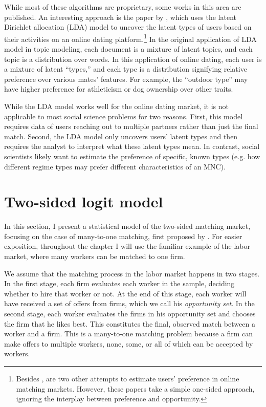 While most of these algorithms are proprietary, some works in this area are
published. An interesting approach is the paper by \citet{Tu2014}, which uses
the latent Dirichlet allocation (LDA) model to uncover the latent types of users
based on their activities on an online dating platform.\footnote{Besides
  \citet{Tu2014}, \citet{Hitsch2010, Goswami2014} are two other attempts to
  estimate users' preference in online matching markets. However, these papers
  take a simple one-sided approach, ignoring the interplay between preference
  and opportunity.} In the original application of LDA model in topic modeling,
each document is a mixture of latent topics, and each topic is a distribution
over words. In this application of online dating, each user is a mixture of
latent ``types,'' and each type is a distribution signifying relative preference
over various mates' features. For example, the ``outdoor type'' may have higher
preference for athleticism or dog ownership over other traits.

While the LDA model works well for the online dating market, it is not
applicable to most social science problems for two reasons. First, this model
requires data of users reaching out to multiple partners rather than just the
final match. Second, the LDA model only uncovers users' latent types and then
requires the analyst to interpret what these latent types mean. In contrast,
social scientists likely want to estimate the preference of specific, known
types (e.g. how different regime types may prefer different characteristics of
an MNC).

\section{Two-sided logit model}

In this section, I present a statistical model of the two-sided matching market,
focusing on the case of many-to-one matching, first proposed by
\cite{Logan1996}. For easier exposition, throughout the chapter I will use the
familiar example of the labor market, where many workers can be matched to one
firm.

We assume that the matching process in the labor market happens in two stages.
In the first stage, each firm evaluates each worker in the sample, deciding
whether to hire that worker or not. At the end of this stage, each worker will
have received a set of offers from firms, which we call his \textit{opportunity
  set}. In the second stage, each worker evaluates the firms in his opportunity
set and chooses the firm that he likes best. This constitutes the final,
observed match between a worker and a firm. This is a many-to-one matching
problem because a firm can make offers to multiple workers, none, some, or all
of which can be accepted by workers.

